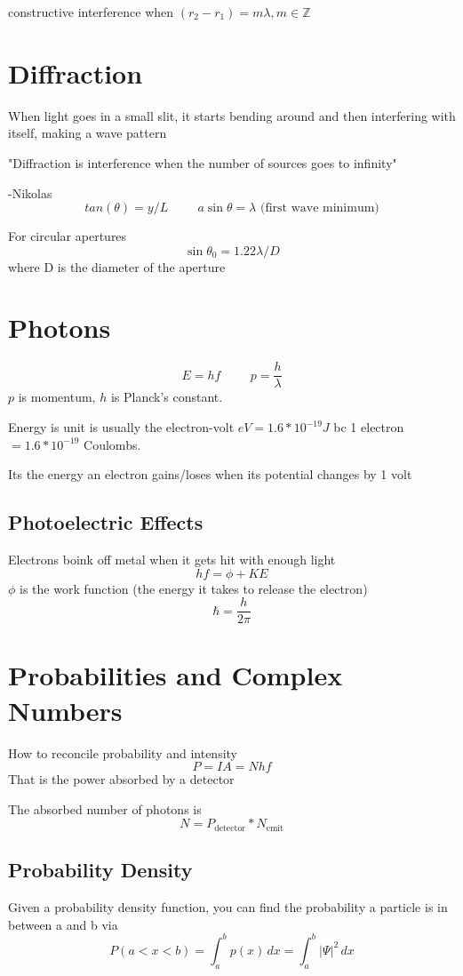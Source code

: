 \documentclass[fleqn]{report}
\newcommand{\hp}{\hspace{1cm}}
\begin{document}
constructive interference when $(r_2 - r_1) = m \lambda, m \in \mathbb{Z}$


\chapter{Diffraction}
When light goes in a small slit, it starts bending around and then interfering with itself, making a wave pattern

"Diffraction is interference when the number of sources goes to infinity"

-Nikolas
\[
tan(\theta) = y/L
\hp
a \sin \theta = \lambda
\textrm{ (first wave minimum)}
\]

For circular apertures
\[
\sin \theta_0 = 1.22 \lambda / D
\]
where D is the diameter of the aperture



\chapter{Photons}
\[
E = hf
\hp
p = \frac{h}{\lambda}
\]
$p$ is momentum, $h$ is Planck's constant.

Energy is unit is usually the electron-volt $eV = 1.6 * 10^{-19} J$ bc 1 electron$ = 1.6 * 10^{-19}$ Coulombs.

Its the energy an electron gains/loses when its potential changes by 1 volt

\section{Photoelectric Effects}
Electrons boink off metal when it gets hit with enough light
\[
hf = \phi + KE
\]
$\phi$ is the work function (the energy it takes to release the electron)
\[
\hbar = \frac{h}{2 \pi}
\]

\chapter{Probabilities and Complex Numbers}
How to reconcile probability and intensity
\[
P = IA = Nhf
\]
That is the power absorbed by a detector

The absorbed number of photons is
\[
N = P_{\textrm{detector}} *N_{\textrm{emit}}
\]

\section{Probability Density}
Given a probability density function, you can find the probability a particle is in between a and b via
\[
P(a < x < b) = \int^b_a p(x) \, dx = \int^b_a | \Psi |^2 \, dx
\]
\end{document}
